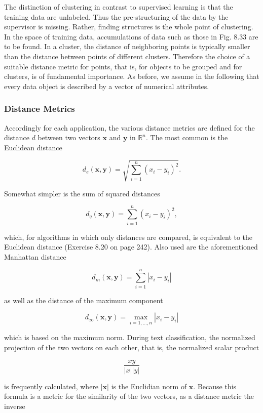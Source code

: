 \documentclass[10pt]{book}
\begin{document}
The distinction of clustering in contrast to supervised learning is that the training data are unlabeled. Thus the pre-structuring of the data by the supervisor is missing. Rather, finding structures is the whole point of clustering. In the space of training data, accumulations of data such as those in Fig. 8.33 are to be found. In a cluster, the distance of neighboring points is typically smaller than the distance between points of different clusters. Therefore the choice of a suitable distance metric for points, that is, for objects to be grouped and for clusters, is of fundamental importance. As before, we assume in the following that every data object is described by a vector of numerical attributes.

\subsubsection*{Distance Metrics}
Accordingly for each application, the various distance metrics are defined for the distance $d$ between two vectors $\boldsymbol{x}$ and $\boldsymbol{y}$ in $\mathbb{R}^{n}$. The most common is the Euclidean distance

$$
d_{e}(\boldsymbol{x}, \boldsymbol{y})=\sqrt{\sum_{i=1}^{n}\left(x_{i}-y_{i}\right)^{2}} .
$$

Somewhat simpler is the sum of squared distances

$$
d_{q}(\boldsymbol{x}, \boldsymbol{y})=\sum_{i=1}^{n}\left(x_{i}-y_{i}\right)^{2},
$$

which, for algorithms in which only distances are compared, is equivalent to the Euclidean distance (Exercise 8.20 on page 242). Also used are the aforementioned Manhattan distance

$$
d_{m}(\boldsymbol{x}, \boldsymbol{y})=\sum_{i=1}^{n}\left|x_{i}-y_{i}\right|
$$

as well as the distance of the maximum component

$$
d_{\infty}(\boldsymbol{x}, \boldsymbol{y})=\max _{i=1, \ldots, n}\left|x_{i}-y_{i}\right|
$$

which is based on the maximum norm. During text classification, the normalized projection of the two vectors on each other, that is, the normalized scalar product

$$
\frac{x y}{|x||y|}
$$

is frequently calculated, where $|\boldsymbol{x}|$ is the Euclidian norm of $\boldsymbol{x}$. Because this formula is a metric for the similarity of the two vectors, as a distance metric the inverse
\end{document}
